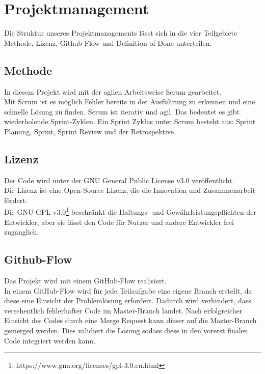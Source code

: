 \chapter{Projektmanagement}\label{ch:projektmanagement}
Die Struktur unseres Projektmanagements lässt sich in die vier Teilgebiete Methode, Lizenz, Github-Flow
und Definition of Done unterteilen.
\section{Methode}\label{sec:methode}

In diesem Projekt wird mit der agilen Arbeitsweise Scrum gearbeitet.\\
Mit Scrum ist es möglich Fehler bereits in der Ausführung zu erkennen und eine schnelle Lösung zu finden.
Scrum ist iterativ und agil. Das bedeutet es gibt wiederholende Sprint-Zyklen.
Ein Sprint Zyklus unter Scrum besteht aus: Sprint Planung, Sprint, Sprint Review und der Retrospektive.

\section{Lizenz}\label{sec:lizenz}

Der Code wird unter der GNU General Public License v3.0 veröffentlicht.\\
Die Lizenz ist eine Open-Source Lizenz, die die Innovation und Zusammenarbeit fördert.\\
Die GNU GPL v3.0\footnote{https://www.gnu.org/licenses/gpl-3.0.en.html} beschränkt die Haftungs- und Gewährleistungspflichten der Entwickler, aber sie lässt den Code für Nutzer und andere Entwickler frei zugänglich.

\section{Github-Flow}\label{sec:github-flow}

Das Projekt wird mit einem GitHub-Flow realisiert.\\
In einem GitHub-Flow wird für jede Teilaufgabe eine eigene Branch erstellt, da diese eine Einsicht der Problemlösung erfordert.
Dadurch wird verhindert, dass versehentlich fehlerhafter Code im Master-Branch landet.
Nach erfolgreicher Einsicht des Codes durch eine Merge Request kann dieser auf die Master-Branch gemerged werden. Dies validiert die Lösung sodass diese in den vorerst finalen Code integriert werden kann.

